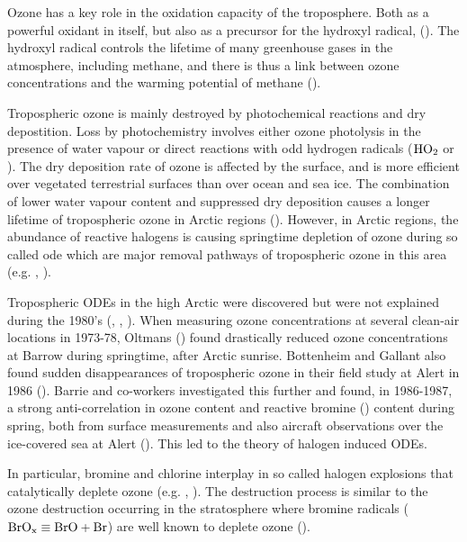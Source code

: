 \medskip

Ozone has a key role in the oxidation capacity of the troposphere. Both as a powerful oxidant in itself, but also as a precursor for the hydroxyl radical,  (\cite{WangJacob1998}). The hydroxyl radical controls the lifetime of many greenhouse gases in the atmosphere, including methane, and there is thus a link between ozone concentrations and the warming potential of methane (\cite{Levy1971}). 

\medskip

Tropospheric ozone is mainly destroyed by photochemical reactions and dry depostition. Loss by photochemistry involves either ozone photolysis in the presence of water vapour or direct reactions with odd hydrogen radicals ($\mathrm{HO_2}$ or ). The dry deposition rate of ozone is affected by the surface, and is more efficient over vegetated terrestrial surfaces than over ocean and sea ice. The combination of lower water vapour content and suppressed dry deposition causes a longer lifetime of tropospheric ozone in Arctic regions (\cite{AMAP2015}). However, in Arctic regions, the abundance of reactive halogens is causing springtime depletion of ozone during so called \acrfull{ode}  which are major removal pathways of tropospheric ozone in this area (e.g. \cite{Simpson2015}, \cite{AMAP2015}).

\medskip

Tropospheric ODEs in the high Arctic were discovered but were not explained during the 1980's (\cite{Oltmans1981}, \cite{oltmans1986surface}, \cite{bottenheim1986measurements}). When measuring ozone concentrations at several clean-air locations in 1973-78, Oltmans (\cite{Oltmans1981}) found drastically reduced ozone concentrations at Barrow during springtime, after Arctic sunrise. Bottenheim and Gallant also found sudden disappearances of tropospheric ozone in their field study at Alert in 1986 (\cite{bottenheim1986measurements}). Barrie and co-workers investigated this further and found, in 1986-1987, a strong anti-correlation in ozone content and reactive bromine () content during spring, both from surface measurements and also aircraft observations over the ice-covered sea at Alert (\cite{barrie}). This led to the theory of halogen induced ODEs. 

\medskip

In particular, bromine and chlorine interplay in so called halogen explosions that catalytically deplete ozone (e.g. \cite{CAO}, \cite{Simpson2015}). The destruction process is similar to the ozone destruction occurring in the stratosphere where bromine radicals ($\mathrm{BrO_x} \equiv \mathrm{BrO} + \mathrm{Br}$) are well known to deplete ozone (\cite{Parella}).   

